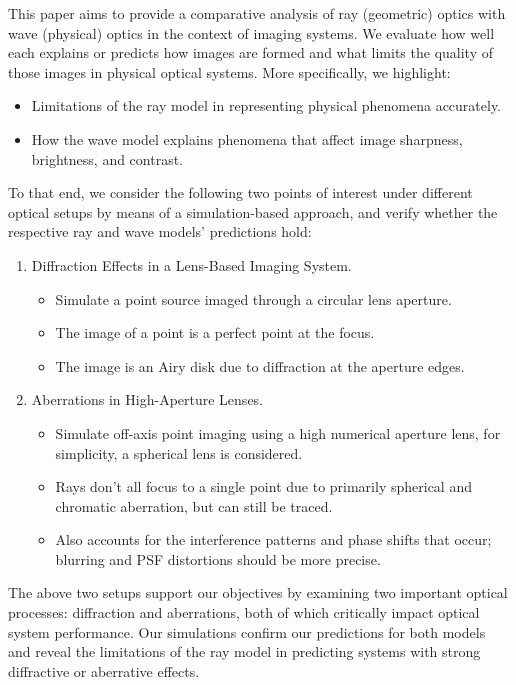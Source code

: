 This paper aims to provide a comparative analysis of ray (geometric) optics with wave (physical) optics in the context of 
imaging systems. We evaluate how well each explains or predicts how images are formed and what limits the quality of those images in physical optical systems.   
More specifically, we highlight: 
\begin{itemize}
    \item Limitations of the ray model in representing physical phenomena accurately.
    \item How the wave model explains phenomena that affect image sharpness, brightness, and contrast.
\end{itemize}
To that end, we consider the following two points of interest under different optical setups by means of a simulation-based approach, and verify
whether the respective ray and wave models' predictions hold:  
\begin{enumerate} 
    \item Diffraction Effects in a Lens-Based Imaging System.
        \begin{itemize}
            \item {} Simulate a point source imaged through a circular lens aperture. 
            \item {} The image of a point is a perfect point at the focus.
            \item {} The image is an Airy disk due to diffraction at the aperture edges.
        \end{itemize}
    \item Aberrations in High-Aperture Lenses.
        \begin{itemize}
            \item {} Simulate off-axis point imaging using a high numerical aperture lens, for simplicity, a spherical lens is considered. 
            \item {} Rays don't all focus to a single point due to primarily spherical and chromatic aberration, but can still be traced.
            \item {} Also accounts for the interference patterns and phase shifts that occur; blurring and PSF distortions should be more precise. 
        \end{itemize}
\end{enumerate}
The above two setups support our objectives by examining two important optical processes: diffraction and aberrations, both of which critically impact optical system performance. Our simulations confirm 
our predictions for both models and reveal the limitations of the ray model in predicting systems with strong diffractive or aberrative effects.   
\newpage

